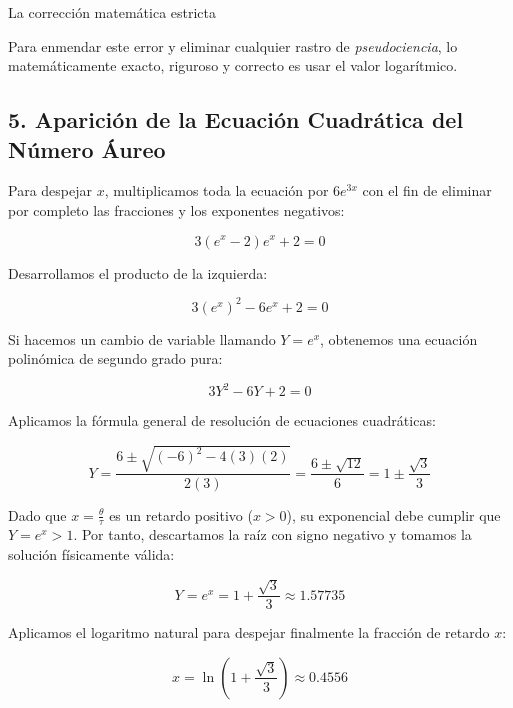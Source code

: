 \documentclass[11pt, a4paper]{article}
\theoremstyle{definition}
\theoremstyle{plain}
\theoremstyle{plain}
\theoremstyle{remark}
\theoremstyle{remark}
\theoremstyle{remark}
\begin{document}
La corrección matemática estricta

Para enmendar este error y eliminar cualquier rastro de \textit{pseudociencia}, lo matemáticamente exacto, riguroso y correcto es usar el valor logarítmico.


\subsection*{5. Aparición de la Ecuación Cuadrática del Número Áureo}

Para despejar $x$, multiplicamos toda la ecuación por $6 e^{3x}$ con el fin de eliminar por completo las fracciones y los exponentes negativos:

\begin{equation}
	3(e^x - 2)e^x + 2 = 0
\end{equation}

Desarrollamos el producto de la izquierda:

\begin{equation}
	3(e^x)^2 - 6e^x + 2 = 0
\end{equation}

Si hacemos un cambio de variable llamando $Y = e^x$, obtenemos una ecuación polinómica de segundo grado pura:

\begin{equation}
	3Y^2 - 6Y + 2 = 0
\end{equation}

Aplicamos la fórmula general de resolución de ecuaciones cuadráticas:

\begin{equation}
	Y = \frac{6 \pm \sqrt{(-6)^2 - 4(3)(2)}}{2(3)} = \frac{6 \pm \sqrt{12}}{6} = 1 \pm \frac{\sqrt{3}}{3}
\end{equation}

Dado que $x = \frac{\theta}{\tau}$ es un retardo positivo ($x > 0$), su exponencial debe cumplir que $Y = e^x > 1$. Por tanto, descartamos la raíz con signo negativo y tomamos la solución físicamente válida:

\begin{equation}
	Y = e^x = 1 + \frac{\sqrt{3}}{3} \approx 1.57735
\end{equation}

Aplicamos el logaritmo natural para despejar finalmente la fracción de retardo $x$:

\begin{equation}
	x = \ln\left(1 + \frac{\sqrt{3}}{3}\right) \approx \mathbf{0.4556}
\end{equation}
\end{document}

